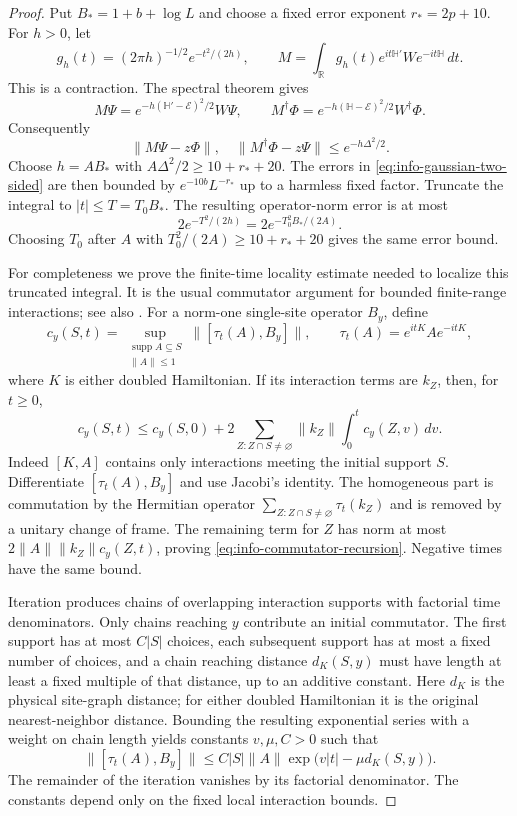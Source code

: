 \documentclass[11pt]{article}
\numberwithin{equation}{section}
\theoremstyle{definition}
\theoremstyle{remark}
\DeclareMathOperator{\supp}{supp}
\newcommand{\norm}[1]{\lVert #1\rVert}
\begin{document}
\begin{proof}
Put $B_*=1+b+\log L$ and choose a fixed error exponent
$r_*=2p+10$.  For $h>0$, let
\[
 g_h(t)=(2\pi h)^{-1/2}e^{-t^2/(2h)},\qquad
 M=\int_{\mathbb R}g_h(t)e^{it\mathbb H'}W e^{-it\mathbb H}\,dt.
\]
This is a contraction.  The spectral theorem gives
\[
 M\Psi=e^{-h(\mathbb H'-\mathcal E)^2/2}W\Psi,
 \qquad
 M^\dagger\Phi=e^{-h(\mathbb H-\mathcal E)^2/2}W^\dagger\Phi.
\]
Consequently
\begin{equation}
 \norm{M\Psi-z\Phi},\quad\norm{M^\dagger\Phi-z\Psi}
       \le e^{-h\Delta^2/2}.
 \label{eq:info-gaussian-two-sided}
\end{equation}
Choose $h=A B_*$ with $A\Delta^2/2\ge10+r_*+20$.  The errors in
\eqref{eq:info-gaussian-two-sided} are then bounded by
$e^{-10b}L^{-r_*}$ up to a harmless fixed factor.  Truncate the integral
to $|t|\le T=T_0B_*$.  The resulting operator-norm error is at most
\[
 2e^{-T^2/(2h)}=2e^{-T_0^2 B_*/(2A)}.
\]
Choosing $T_0$ after $A$ with $T_0^2/(2A)\ge10+r_*+20$ gives the
same error bound.

For completeness we prove the finite-time locality estimate needed
to localize this truncated integral.  It is the usual commutator
argument for bounded finite-range interactions; see also
\cite{NachtergaeleOgataSims2006}.  For a norm-one single-site operator
$B_y$, define
\[
 c_y(S,t)=\sup_{\substack{\supp A\subseteq S\\\norm A\le1}}
                  \norm{[\tau_t(A),B_y]},
 \qquad \tau_t(A)=e^{itK}Ae^{-itK},
\]
where $K$ is either doubled Hamiltonian.  If its interaction terms are
$k_Z$, then, for $t\ge0$,
\begin{equation}
 c_y(S,t)\le c_y(S,0)+
 2\sum_{Z:Z\cap S\ne\varnothing}\norm{k_Z}
                      \int_0^t c_y(Z,v)\,dv.
 \label{eq:info-commutator-recursion}
\end{equation}
Indeed $[K,A]$ contains only interactions meeting the initial support
$S$.  Differentiate $[\tau_t(A),B_y]$ and use Jacobi's identity.
The homogeneous part is commutation by the Hermitian operator
$\sum_{Z:Z\cap S\ne\varnothing}\tau_t(k_Z)$ and is removed by a
unitary change of frame.  The remaining term for $Z$ has norm at most
$2\norm A\norm{k_Z}c_y(Z,t)$, proving
\eqref{eq:info-commutator-recursion}.  Negative times have the same
bound.

Iteration produces chains of overlapping interaction supports with
factorial time denominators.  Only chains reaching $y$ contribute an
initial commutator.  The first support has at most $C|S|$ choices,
each subsequent support has at most a fixed number of choices, and a
chain reaching distance $d_K(S,y)$ must have length at least a fixed
multiple of that distance, up to an additive constant.  Here $d_K$
is the physical site-graph distance; for either doubled Hamiltonian
it is the original nearest-neighbor distance.  Bounding the resulting
exponential series with a weight on chain length yields constants
$v,\mu,C>0$ such that
\begin{equation}
 \norm{[\tau_t(A),B_y]}
       \le C|S|\norm A\exp\bigl(v|t|-\mu d_K(S,y)\bigr).
 \label{eq:info-lr}
\end{equation}
The remainder of the iteration vanishes by its factorial denominator.
The constants depend only on the fixed local interaction bounds.


\end{proof}
\end{document}
